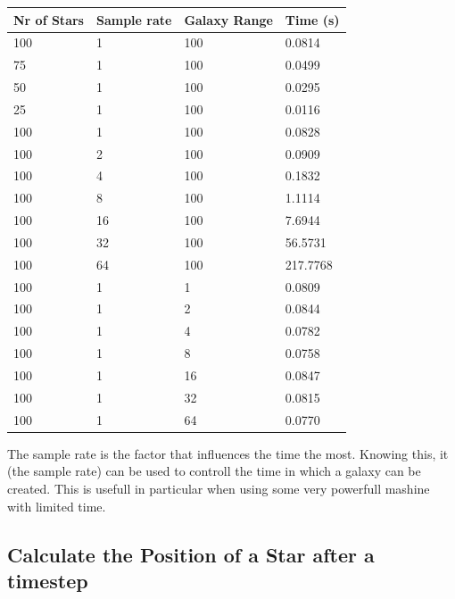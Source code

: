 \begin{tabular}{l | l | l | l}
  Nr of Stars & Sample rate & Galaxy Range & Time (s) \\\hline


  100         & 1           & 100          & 0.0814 \\
  75          & 1           & 100          & 0.0499 \\
  50          & 1           & 100          & 0.0295 \\
  25          & 1           & 100          & 0.0116 \\ \hline

  100         & 1           & 100          & 0.0828 \\
  100         & 2           & 100          & 0.0909 \\
  100         & 4           & 100          & 0.1832 \\
  100         & 8           & 100          & 1.1114 \\
  100         & 16          & 100          & 7.6944 \\
  100         & 32          & 100          & 56.5731 \\
  100         & 64          & 100          & 217.7768 \\ \hline

  100         & 1           & 1            & 0.0809 \\
  100         & 1           & 2            & 0.0844 \\
  100         & 1           & 4            & 0.0782 \\
  100         & 1           & 8            & 0.0758 \\
  100         & 1           & 16           & 0.0847 \\
  100         & 1           & 32           & 0.0815 \\
  100         & 1           & 64           & 0.0770 \\

\end{tabular}

The sample rate is the factor that influences the time the most. Knowing this,
it (the sample rate) can be used to controll the time in which a galaxy can
be created.
This is usefull in particular when using some very powerfull mashine with
limited time.

\subsection{Calculate the Position of a Star after a timestep}

